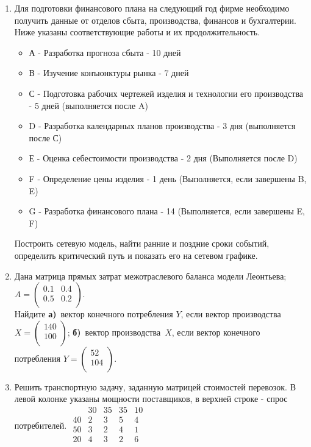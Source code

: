 \documentclass[a5paper,12pt]{extarticle}
\begin{document}
\begin{LOOP}{11}
\begin{enumerate}
\item 
Для подготовки финансового плана на следующий год фирме необходимо получить данные от отделов сбыта, производства, финансов и бухгалтерии. Ниже указаны соответствующие работы и их продолжительность.
	\begin{itemize}
	\item 
    А - Разработка прогноза сбыта - 10 дней
	\item 
    В - Изучение конъюнктуры рынка - 7 дней
	\item 
    С - Подготовка рабочих чертежей изделия и технологии его производства - 5 дней (выполняется после A)
	\item 
    D - Разработка календарных планов производства - 3 дня (выполняется после С)
	\item 
    Е - Оценка себестоимости производства - 2 дня (Выполняется после D)
	\item 
    F - Определение цены изделия - 1 день (Выполняется, если завершены B, E)
	\item 
    G - Разработка финансового плана - 14 (Выполняется, если завершены E, F)
	\end{itemize}
Построить сетевую модель, найти ранние и поздние сроки событий, определить критический путь и показать его на сетевом графике.
\item 
Дана матрица прямых затрат межотраслевого баланса модели Леонтьева;
$A=\begin{pmatrix}
  0.1& 0.4\\
  0.5& 0.2\\ 
\end{pmatrix}$.\\
Найдите \textbf{а)}~вектор конечного потребления $Y$, если вектор производства 
$X=\begin{pmatrix}
  140\\
  100\\ 
\end{pmatrix}$;
\textbf{б)}~вектор производства~$X$, если вектор конечного потребления
$Y=\begin{pmatrix}
  52\\
  104\\ 
\end{pmatrix}$.

\item 
Решить транспортную задачу, заданную матрицей стоимостей перевозок. В левой колонке указаны мощности поставщиков, в верхней строке - спрос потребителей. \( \begin{array}{c|cccc} & 30 & 35 & 35 & 10 \\ \hline 40 & 2 & 3 & 5 & 4 \\ 50 & 3 & 2 & 4 & 1 \\ 20 & 4 & 3 & 2 & 6 \\ \end{array} \)
\end{enumerate}




\end{LOOP}
\end{document}
